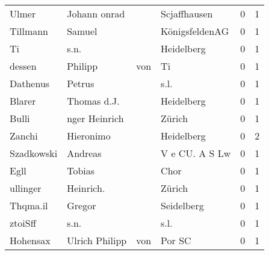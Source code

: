 \begin{tabular}{llllrr}
                    Ulmer &                       Johann onrad &             &                                Scjaffhausen &          0 &         1 \\
                 Tillmann &                             Samuel &             &                              KönigsfeldenAG &          0 &         1 \\
                       Ti &                               s.n. &             &                                  Heidelberg &          0 &         1 \\
                   dessen &                            Philipp &         von &                                          Ti &          0 &         1 \\
                 Dathenus &                             Petrus &             &                                        s.l. &          0 &         1 \\
                   Blarer &                        Thomas d.J. &             &                                  Heidelberg &          0 &         1 \\
                    Bulli &                      nger Heinrich &             &                                      Zürich &          0 &         1 \\
                   Zanchi &                          Hieronimo &             &                                  Heidelberg &          0 &         2 \\
               Szadkowski &                            Andreas &             &                              V e CU. A S Lw &          0 &         1 \\
                     Egll &                             Tobias &             &                                        Chor &          0 &         1 \\
                 ullinger &                          Heinrich. &             &                                      Zürich &          0 &         1 \\
                 Thqma.il &                             Gregor &             &                                  Seidelberg &          0 &         1 \\
                  ztoiSff &                               s.n. &             &                                        s.l. &          0 &         1 \\
                 Hohensax &                     Ulrich Philipp &         von &                                      Por SC &          0 &         1 \\

\end{tabular}
